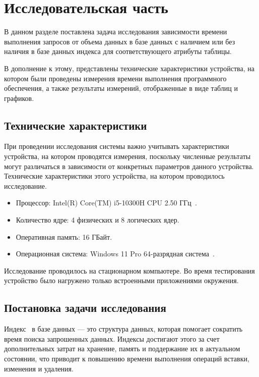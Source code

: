 \chapter{Исследовательская часть}

В данном разделе поставлена задача исследования зависимости времени выполнения запросов от объема данных в базе данных с наличием или без наличия в базе данных индекса для соответствующего атрибуты таблицы.

В дополнение к этому, представлены технические характеристики устройства, на котором были проведены измерения времени выполнения программного обеспечения, а также результаты измерений, отображенные в виде таблиц и графиков.

\section{Технические характеристики}

При проведении исследования системы важно учитывать характеристики устройства, на котором проводятся измерения, поскольку численные результаты могут различаться в зависимости от конкретных параметров данного устройства.
Технические характеристики этого устройства, на котором проводилось исследование.
\begin{itemize}
	\item Процессор: Intel(R) Core(TM) i5-10300H CPU 2.50 ГГц~\cite{intel}.
	\item Количество ядре: 4 физических и 8 логических ядер.
	\item Оперативная память: 16 ГБайт.
	\item Операционная система: Windows 11 Pro 64-разрядная система~\cite{windows}.
\end{itemize}

Исследование проводилось на стационарном компьютере. Во время тестирования устройство было нагружено только встроенными приложениями окружения.

\section{Постановка задачи исследования}

Индекс~\cite{indexsql} в базе данных --- это структура данных, которая помогает сократить время поиска запрошенных данных. Индексы достигают этого за счет дополнительных затрат на хранение, память и поддержание их в актуальном состоянии, что приводит к повышению времени выполнения операций вставки, изменения и удаления.


